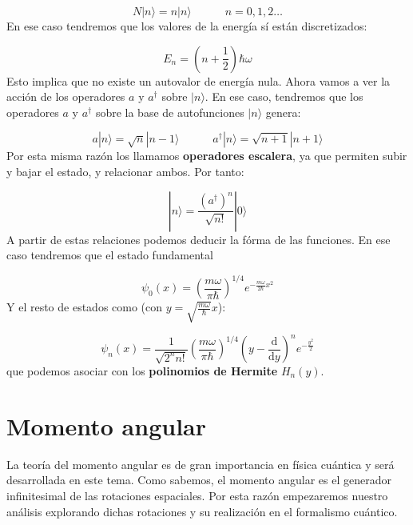 \documentclass[12pt]{book}
\numberwithin{equation}{chapter}
\numberwithin{figure}{chapter}
\newcommand{\tquad}{\quad \quad \quad}
\newcommand{\parentesis}[1]{\left( #1  \right)}
\newcommand{\D}{\mathrm{d}}
\newcommand{\derivadas}[2]{\frac{\D #1}{\D #2}}
\begin{document}
\begin{equation}
N | n \rangle = n |n \rangle \tquad n = 0,1,2 \ldots
\end{equation}
En ese caso tendremos que los valores de la energía sí están discretizados:

\begin{equation}
E_n=\parentesis{n+\frac{1}{2}} \hbar \omega
\end{equation}
Esto implica que no existe un autovalor de energía nula. Ahora vamos a ver la acción de los operadores $a$ y $a^\dagger$ sobre $|n\rangle$. En ese caso, tendremos que los operadores $a$ y $a^\dagger$ sobre la base de autofunciones $|n\rangle$ genera:

\begin{equation}
a | n \rangle = \sqrt{n} | n - 1 \rangle \tquad a^{\dagger} | n \rangle = \sqrt{n+1} |n+1\rangle
\end{equation}
Por esta misma razón los llamamos \textbf{operadores escalera}, ya que permiten subir y bajar el estado, y relacionar ambos. Por tanto:

\begin{equation}
| n  \rangle = \frac{(a^\dagger)^n}{\sqrt{n!}} | 0 \rangle 
\end{equation}
A partir de estas relaciones podemos deducir la fórma de las funciones. En ese caso tendremos que el estado fundamental

\begin{equation}
\psi_0 (x) = \parentesis{\frac{m \omega}{\pi \hbar}}^{1/4} e^{- \frac{m \omega}{2 \hbar} x^2}
\end{equation} 
Y el resto de estados como (con $y=\sqrt{\frac{m\omega}{\hbar}} x$):

\begin{equation}
\psi_n(x) = \frac{1}{\sqrt{2^n n!}} \parentesis{\frac{m \omega}{\pi \hbar}}^{1/4} \parentesis{y - \derivadas{}{y}}^n e^{- \frac{y^2}{2}}
\end{equation}
que podemos asociar con los \textbf{polinomios de Hermite} $H_n(y)$.

\chapter{Momento angular}

La teoría del momento angular es de gran importancia en física cuántica y será desarrollada en este tema. Como sabemos, el momento angular es el generador infinitesimal de las rotaciones espaciales. Por esta razón empezaremos nuestro análisis explorando dichas rotaciones y su realización en el formalismo cuántico. 
\end{document}
